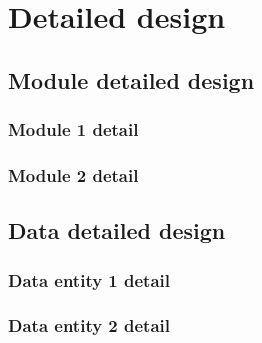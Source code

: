 \documentclass[12pt]{article}
\begin{document}
\section{Detailed design}
\subsection{Module detailed design}
\subsubsection{Module 1 detail}
\subsubsection{Module 2 detail}
\subsection{Data detailed design}
\subsubsection{Data entity 1 detail}
\subsubsection{Data entity 2 detail}
\end{document}
